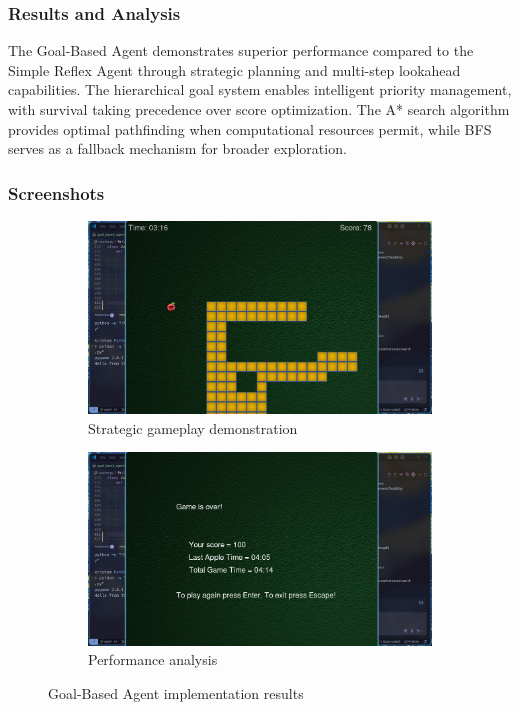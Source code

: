 \documentclass[11pt,a4paper]{article}
\begin{document}
\subsubsection{Results and Analysis}
The Goal-Based Agent demonstrates superior performance compared to the Simple Reflex Agent through strategic planning and multi-step lookahead capabilities. The hierarchical goal system enables intelligent priority management, with survival taking precedence over score optimization. The A* search algorithm provides optimal pathfinding when computational resources permit, while BFS serves as a fallback mechanism for broader exploration.

\subsubsection{Screenshots}
\begin{figure}[H]
    \centering
    \begin{subfigure}{0.45\textwidth}
        \includegraphics[width=\textwidth]{ss/goal_based_play.png}
        \caption{Strategic gameplay demonstration}
    \end{subfigure}
    \hfill
    \begin{subfigure}{0.45\textwidth}
        \includegraphics[width=\textwidth]{ss/goal_based_result.png}
        \caption{Performance analysis}
    \end{subfigure}
    \caption{Goal-Based Agent implementation results}
\end{figure}
\end{document}
